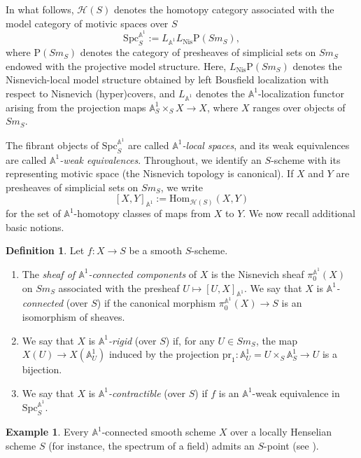 \documentclass[10pt]{amsart}
\renewcommand{\AA}{\mathbb{A}}
\numberwithin{equation}{section} %
\theoremstyle{plain}
\theoremstyle{definition}
\newtheorem{defn}[defn]{Definition}
\newtheorem{example}[example]{Example}
\theoremstyle{remark}
\begin{document}
In what follows, $\mathcal{H}(S)$ denotes the homotopy category associated with the model category of motivic spaces over $S$
\[
\mathrm{Spc}_S^{\AA^1} := L_{\AA^1} L_{\mathrm{Nis}} \mathrm{P}(Sm_S),
\]
where $\mathrm{P}(Sm_S)$ denotes the category of presheaves of simplicial sets on $Sm_S$ 
endowed with the projective model structure. 
Here, $L_{\mathrm{Nis}} \mathrm{P}(Sm_S)$ denotes the Nisnevich-local model structure obtained by left 
Bousfield localization with respect to Nisnevich (hyper)covers, 
and $L_{\AA^1}$ denotes the $\AA^1$-localization functor arising from the projection maps
$\AA^1_S \times_S X \to X$, where $X$ ranges over objects of $Sm_S$. 
\medskip

The fibrant objects of $\mathrm{Spc}_S^{\AA^1}$ are called \emph{$\AA^1$-local spaces}, 
and its weak equivalences are called \emph{$\AA^1$-weak equivalences}. 
Throughout, we identify an $S$-scheme with its representing motivic space (the Nisnevich topology is canonical). 
If $X$ and $Y$ are presheaves of simplicial sets on $Sm_S$, we write
\[
[X,Y]_{\AA^1} := \mathrm{Hom}_{\mathcal{H}(S)}(X,Y)
\]
for the set of $\AA^1$-homotopy classes of maps from $X$ to $Y$. 
We now recall additional basic notions.

\begin{defn}\label{A1-rigid}\label{defn:A1-contractibility}
Let $f \colon X \to S$ be a smooth $S$-scheme.
\begin{enumerate}
    \item The \emph{sheaf of $\AA^1$-connected components} of $X$ is the Nisnevich sheaf 
    $\pi_0^{\AA^1}(X)$ on $Sm_S$ 
    associated with the presheaf $U \mapsto [U,X]_{\AA^1}$.  
    We say that $X$ is \emph{$\AA^1$-connected} (over $S$) if the canonical morphism 
    $\pi_0^{\AA^1}(X) \to S$ is an isomorphism of sheaves.
    \item We say that $X$ is \emph{$\AA^1$-rigid} (over $S$) if, for any $U \in Sm_S$, 
    the map $X(U) \to X(\AA^1_U)$ induced by the projection 
    $\mathrm{pr}_1 \colon \AA^1_U = U \times_S \AA^1_S \to U$ is a bijection.  
    \item We say that $X$ is \emph{$\AA^1$-contractible} (over $S$) 
    if $f$ is an $\AA^1$-weak equivalence in $\mathrm{Spc}_S^{\AA^1}$.
\end{enumerate}
\end{defn}

\begin{example}\label{S-point}
Every $\AA^1$-connected smooth scheme $X$ over a locally Henselian scheme $S$ (for instance, the spectrum of a field) admits an $S$-point (see \cite[Remark~2.5]{MV99}).
\end{example}
\end{document}
